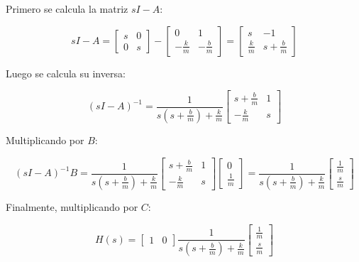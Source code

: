 \documentclass[a4paper]{article}
\begin{document}
Primero se calcula la matriz \(sI-A\):

\begin{equation}
	sI-A =
	\begin{bmatrix}
		s & 0\\
		0 & s
	\end{bmatrix}
	-
	\begin{bmatrix}
		0 & 1\\
		-\frac{k}{m} & -\frac{b}{m}
	\end{bmatrix}
	=
	\begin{bmatrix}
		s & -1\\
		\frac{k}{m} & s+\frac{b}{m}
	\end{bmatrix}
\end{equation}

Luego se calcula su inversa:

\begin{equation}
	(sI-A)^{-1} =
	\frac{1}{s\left(s+\frac{b}{m}\right)+\frac{k}{m}}
	\begin{bmatrix}
		s+\frac{b}{m} & 1\\
		-\frac{k}{m} & s
	\end{bmatrix}
\end{equation}

Multiplicando por \(B\):

\begin{equation}
	(sI-A)^{-1}B =
	\frac{1}{s\left(s+\frac{b}{m}\right)+\frac{k}{m}}
	\begin{bmatrix}
		s+\frac{b}{m} & 1\\
		-\frac{k}{m} & s
	\end{bmatrix}
	\begin{bmatrix}
		0\\
		\frac{1}{m}
	\end{bmatrix}
	=
	\frac{1}{s\left(s+\frac{b}{m}\right)+\frac{k}{m}}
	\begin{bmatrix}
		\frac{1}{m}\\
		\frac{s}{m}
	\end{bmatrix}
\end{equation}

Finalmente, multiplicando por \(C\):

\begin{equation}
	H(s)=
	\begin{bmatrix}
		1 & 0
	\end{bmatrix}
	\frac{1}{s\left(s+\frac{b}{m}\right)+\frac{k}{m}}
	\begin{bmatrix}
		\frac{1}{m}\\
		\frac{s}{m}
	\end{bmatrix}
\end{equation}
\end{document}
